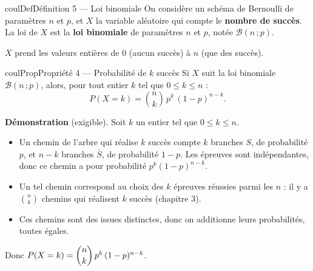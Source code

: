 \documentclass[11pt,a4paper]{article}
\makeatletter
\newcounter{lycee@signet}
\newcommand{\signet}[3][]{\stepcounter{lycee@signet}%
  \edef\lycee@dest{\if\relax\detokenize{#1}\relax
    signet.\arabic{lycee@signet}\else#1\fi}%
  \hypertarget{\lycee@dest}{}\bookmark[level=#2,dest=\lycee@dest]{#3}}
\newenvironment{definitionbox}[1][Définition]%
  {\begin{boitecours}[phantom={\signet{2}{#1}}]{coulDef}{#1}}{\end{boitecours}}
\newenvironment{proprietebox}[1][Propriété]%
  {\begin{boitecours}[phantom={\signet{2}{#1}}]{coulProp}{#1}}{\end{boitecours}}
\makeatother
\begin{document}
\begin{definitionbox}[Définition 5 --- Loi binomiale]
On considère un schéma de Bernoulli de paramètres $n$ et $p$, et $X$ la variable
aléatoire qui compte le \textbf{nombre de succès}. La loi de $X$ est la \textbf{loi
binomiale} de paramètres $n$ et $p$, notée $\mathcal{B}(n\,;p)$.

\smallskip
$X$ prend les valeurs entières de $0$ (aucun succès) à $n$ (que des succès).
\end{definitionbox}

\begin{proprietebox}[Propriété 4 --- Probabilité de $k$ succès]
Si $X$ suit la loi binomiale $\mathcal{B}(n\,;p)$, alors, pour tout entier $k$ tel que
$0\leq k\leq n$ :
\[
P(X=k)=\binom{n}{k}\,p^{k}\,(1-p)^{n-k}.
\]
\end{proprietebox}

\textbf{\color{coulMeth}Démonstration} (exigible).
Soit $k$ un entier tel que $0\leq k\leq n$.
\begin{itemize}
  \item Un chemin de l'arbre qui réalise $k$ succès compte $k$ branches $S$, de
        probabilité $p$, et $n-k$ branches $\overline{S}$, de probabilité $1-p$. Les
        épreuves sont indépendantes, donc ce chemin a pour probabilité
        $p^{k}(1-p)^{n-k}$.
  \item Un tel chemin correspond au choix des $k$ épreuves réussies parmi les $n$ : il
        y a $\binom{n}{k}$ chemins qui réalisent $k$ succès (chapitre 3).
  \item Ces chemins sont des issues distinctes, donc on additionne leurs probabilités,
        toutes égales.
\end{itemize}
Donc $P(X=k)=\dbinom{n}{k}\,p^{k}\,(1-p)^{n-k}$.
\end{document}
